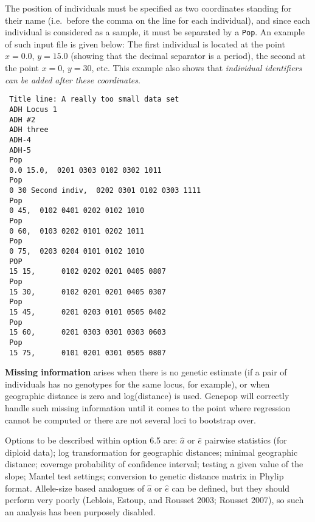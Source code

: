 \documentclass[12pt,]{book}
\theoremstyle{definition}
\theoremstyle{definition}
\theoremstyle{definition}
\theoremstyle{remark}
\begin{document}
The position of individuals must be specified as two coordinates
standing for their name (i.e.~before the comma on the line for each
individual), and since each individual is considered as a sample, it
must be separated by a \texttt{Pop}. An example of such input file is
given below: The first individual is located at the point \(x = 0.0\),
\(y = 15.0\) (showing that the decimal separator is a period), the
second at the point \(x = 0\), \(y =30\), etc. This example also shows
that \emph{individual identifiers can be added after these coordinates}.

\begin{verbatim}
 Title line: A really too small data set
 ADH Locus 1
 ADH #2
 ADH three
 ADH-4
 ADH-5
 Pop
 0.0 15.0,  0201 0303 0102 0302 1011
 Pop
 0 30 Second indiv,  0202 0301 0102 0303 1111
 Pop
 0 45,  0102 0401 0202 0102 1010
 Pop
 0 60,  0103 0202 0101 0202 1011
 Pop
 0 75,  0203 0204 0101 0102 1010
 POP
 15 15,      0102 0202 0201 0405 0807
 Pop
 15 30,      0102 0201 0201 0405 0307
 Pop
 15 45,      0201 0203 0101 0505 0402
 Pop
 15 60,      0201 0303 0301 0303 0603
 Pop
 15 75,      0101 0201 0301 0505 0807
\end{verbatim}

\textbf{Missing information} arises when there is no genetic estimate
(if a pair of individuals has no genotypes for the same locus, for
example), or when geographic distance is zero and log(distance) is used.
Genepop will correctly handle such missing information until it comes to
the point where regression cannot be computed or there are not several
loci to bootstrap over.

Options to be described within option 6.5 are: \(\hat{a}\) or
\(\hat{e}\) pairwise statistics (for diploid data); log transformation
for geographic distances; minimal geographic distance; coverage
probability of confidence interval; testing a given value of the slope;
Mantel test settings; conversion to genetic distance matrix in Phylip
format. Allele-size based analogues of \(\hat{a}\) or \(\hat{e}\) can be
defined, but they should perform very poorly (Leblois, Estoup, and
Rousset 2003; Rousset 2007), so such an analysis has been purposely
disabled.
\end{document}
